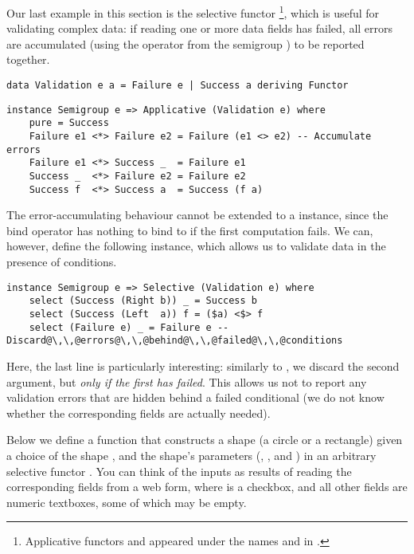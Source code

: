 {Our last example in this section is the selective functor
\footnote{Applicative functors  and 
appeared under the names  and  in
\citep{mcbride2008applicative}.}, which is useful for validating complex data:
if reading one or more data fields has failed, all errors are accumulated (using
the operator \hs{<>} from the semigroup ) to be reported together.

\vspace{1mm}
\begin{verbatim}
data Validation e a = Failure e | Success a deriving Functor
\end{verbatim}
\vspace{1mm}
\begin{verbatim}
instance Semigroup e => Applicative (Validation e) where
    pure = Success
    Failure e1 <*> Failure e2 = Failure (e1 <> e2) -- Accumulate errors
    Failure e1 <*> Success _  = Failure e1
    Success _  <*> Failure e2 = Failure e2
    Success f  <*> Success a  = Success (f a)
\end{verbatim}
\vspace{1mm}

\noindent
The error-accumulating behaviour cannot be extended to a  instance,
since the bind operator has nothing to bind to if the first computation fails.
We can, however, define the following  instance, which allows us
to validate data in the presence of conditions.

\vspace{1mm}
\begin{verbatim}
instance Semigroup e => Selective (Validation e) where
    select (Success (Right b)) _ = Success b
    select (Success (Left  a)) f = ($a) <$> f
    select (Failure e) _ = Failure e -- Discard@\,\,@errors@\,\,@behind@\,\,@failed@\,\,@conditions
\end{verbatim}
\vspace{1mm}

\noindent
Here, the last line is particularly interesting: similarly to , we
discard the second argument, but \emph{only if the first has failed}. This
allows us not to report any validation errors that are hidden behind a failed
conditional (we do not know whether the corresponding fields are actually
needed).

Below we define a function that constructs a shape (a circle or a rectangle)
given a choice of the shape , and the shape's parameters (, ,
and ) in an arbitrary selective functor . You can think of the
inputs as results of reading the corresponding fields from a web form, where
 is a checkbox, and all other fields are numeric textboxes, some of which
may be empty.

}
